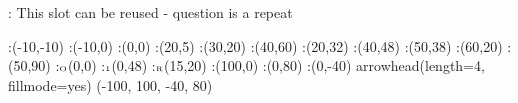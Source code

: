 \question [TODO]: This slot can be reused - question is a repeat



  \begin{marginfigure}
      :(-10,-10)
      :(-10,0)
      :(0,0)
      :(20,5)
      :(30,20)
      :(40,60)
      :(20,32)
      :(40,48)
      :(50,38)
      :(60,20)
      :(50,90)
      \def\Xmax{100}
      \def\Ymax{80}
      \def\Xmin{-100}
      \def\Ymin{-40}
      :$\tiny\text{O}$(0,0)
      :$\tiny\text{1}$(0,48)
      :$\tiny\text{R}$(15,20)
      :(\Xmax,0)
      :(0,\Ymax)
      :(0,\Ymin)
    \figdrawbegin{}
      \figset arrowhead(length=4, fillmode=yes)
      (\Xmin, \Xmax, \Ymin, \Ymax)
      \figdrawcurve [1,10,50,60,70,80]
      \figdrawcurve [2,10,20,30,40,90]
    \figdrawend
    \centerline{\box\figBoxA}
  \end{marginfigure}

